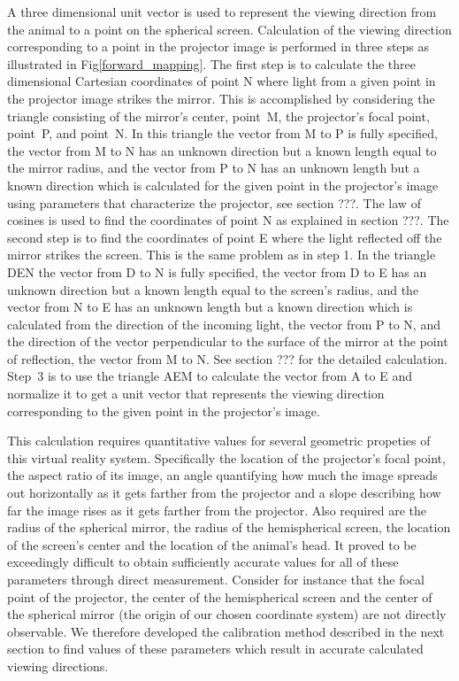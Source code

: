 \documentclass[10pt,letterpaper]{article}
\begin{document}
A three dimensional unit vector is used to represent the viewing direction from
the animal to a point on the spherical screen.  Calculation of the viewing
direction corresponding to a point in the projector image is performed in three
steps as illustrated in Fig\ref{forward_mapping}. The first step is to
calculate the three dimensional Cartesian coordinates of point N where light
from a given point in the projector image strikes the mirror. This is
accomplished by considering the triangle consisting of the mirror's center,
point~M, the projector's focal point, point~P, and point~N. In this triangle
the vector from M to P is fully specified, the vector from M to N has an
unknown direction but a known length equal to the mirror radius, and the vector
from P to N has an unknown length but a known direction which is calculated for
the given point in the projector's image using parameters that characterize the
projector, see section ???. The law of cosines is used to find the coordinates
of point N as explained in section ???. The second step is to find the
coordinates of point E where the light reflected off the mirror strikes the
screen. This is the same problem as in step 1. In the triangle DEN the vector
from D to N is fully specified, the vector from D to E has an unknown direction
but a known length equal to the screen's radius, and the vector from N to E has
an unknown length but a known direction which is calculated from the direction
of the incoming light, the vector from P to N, and the direction of the vector
perpendicular to the surface of the mirror at the point of reflection, the
vector from M to N. See section ??? for the detailed calculation. Step~3 is
to use the triangle AEM to calculate the vector from A to E and normalize it to
get a unit vector that represents the viewing direction corresponding to the
given point in the projector's image.


This calculation requires quantitative values for several geometric propeties
of this virtual reality system. Specifically the location of the projector's
focal point, the aspect ratio of its image, an angle quantifying how much the
image spreads out horizontally as it gets farther from the projector and a
slope describing how far the image rises as it gets farther from the projector.
Also required are the radius of the spherical mirror, the radius of the
hemispherical screen, the location of the screen's center and the location of
the animal's head. It proved to be exceedingly difficult to obtain sufficiently
accurate values for all of these parameters through direct measurement.
Consider for instance that the focal point of the projector, the center of the
hemispherical screen and the center of the spherical mirror (the origin of our
chosen coordinate system) are not directly observable. We therefore developed
the calibration method described in the next section to find values of these
parameters which result in accurate calculated viewing directions.
\end{document}
